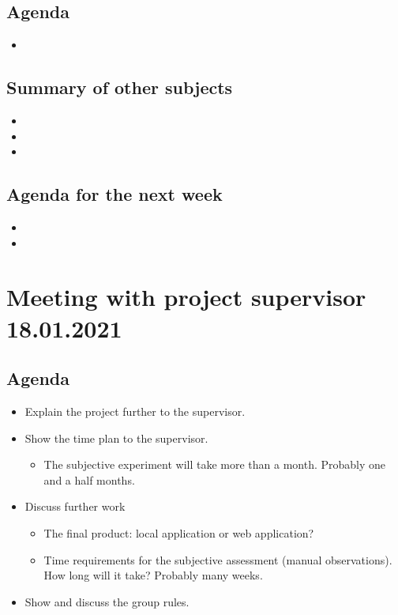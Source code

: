 \subsection*{Agenda}
\begin{itemize}
    \item 
\end{itemize}

\subsection*{Summary of other subjects}
\begin{itemize}
    \item 
    \item 
    \item 
\end{itemize}

\subsection*{Agenda for the next week}
\begin{itemize}
    \item 
    \item 
\end{itemize}


\section*{Meeting with project supervisor 18.01.2021}
\subsection*{Agenda}
\begin{itemize}
    \item Explain the project further to the supervisor.
    \item Show the time plan to the supervisor.
        \begin{itemize}
            \item The subjective experiment will take more than a month. Probably one and a half months.
    \end{itemize}
    \item Discuss further work
    \begin{itemize}
        \item The final product: local application or web application?
        \item Time requirements for the subjective assessment (manual observations). How long will it take? Probably many weeks.
    \end{itemize}
    \item Show and discuss the group rules.
\end{itemize}

